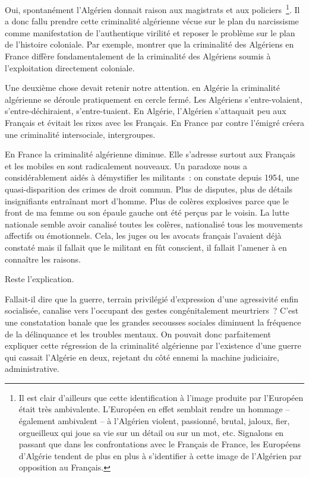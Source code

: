\documentclass[french,twoside]{book} %
\begin{document}
Oui, spontanément l’Algérien donnait raison aux magistrats et aux policiers \footnote{Il est clair d’ailleurs que cette identification à l’image produite par l’Européen était très ambivalente. L’Européen en effet semblait rendre un hommage – également ambivalent – à l’Algérien violent, passionné, brutal, jaloux, fier, orgueilleux qui joue sa vie sur un détail ou sur un mot, etc. Signalons en passant que dans les confrontations avec le Français de France, les Européens d’Algérie tendent de plus en plus à s’identifier à cette image de l’Algérien par opposition au Français.}. Il a donc fallu prendre cette criminalité algérienne vécue sur le plan du narcissisme comme manifestation de l’authentique virilité et reposer le problème sur le plan de l’histoire coloniale. Par exemple, montrer que la criminalité des Algériens en France diffère fondamentalement de la criminalité des Algériens soumis à l’exploitation directement coloniale.\par
 Une deuxième chose devait retenir notre attention. en Algérie la criminalité algérienne se déroule pratiquement en cercle fermé. Les Algériens s’entre-volaient, s’entre-déchiraient, s’entre-tuaient. En Algérie, l’Algérien s’attaquait peu aux Français et évitait les rixes avec les Français. En France par contre l’émigré créera une criminalité intersociale, intergroupes.\par
En France la criminalité algérienne diminue. Elle s’adresse surtout aux Français et les mobiles en sont radicalement nouveaux. Un paradoxe nous a considérablement aidés à démystifier les militants : on constate depuis 1954, une quasi-disparition des crimes de droit commun. Plus de disputes, plus de détails insignifiants entraînant mort d’homme. Plus de colères explosives parce que le front de ma femme ou son épaule gauche ont été perçus par le voisin. La lutte nationale semble avoir canalisé toutes les colères, nationalisé tous les mouvements affectifs ou émotionnels. Cela, les juges ou les avocats français l’avaient déjà constaté mais il fallait que le militant en fût conscient, il fallait l’amener à en connaître les raisons.\par
Reste l’explication.\par
Fallait-il dire que la guerre, terrain privilégié d’expression d’une agressivité enfin socialisée, canalise vers l’occupant des gestes congénitalement meurtriers ? C’est une constatation banale que les grandes secousses sociales diminuent la fréquence de la délinquance et les troubles mentaux. On pouvait donc parfaitement expliquer cette régression de la criminalité algérienne par l’existence d’une guerre qui cassait l’Algérie en deux, rejetant du côté ennemi la machine judiciaire, administrative.\par
\end{document}
